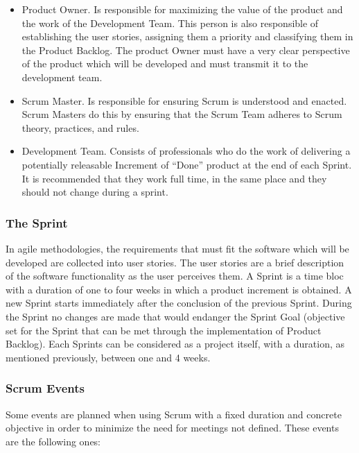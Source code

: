 \begin{itemize}
	\item Product Owner. Is responsible for maximizing the value of the product and the work of the	Development Team. This person is also responsible of establishing the user stories, assigning them a priority and classifying them in the Product Backlog. The product Owner must have a very clear perspective of the product which will be developed and must transmit it to the development team.
	
	\item Scrum Master. Is responsible for ensuring Scrum is understood and enacted. Scrum Masters do this by ensuring that the Scrum Team adheres to Scrum theory, practices, and rules. 
	
	\item Development Team. Consists of professionals who do the work of delivering a potentially releasable Increment of “Done” product at the end of each Sprint. It is recommended that they work full time, in the same place and they should not change during a sprint.
\end{itemize}


\subsubsection{The Sprint}

In agile methodologies, the requirements that must fit the software which will be developed are collected into user stories. The user stories are a brief description of the software functionality as the user perceives them. \cite{Coh04} A Sprint is a time bloc with a duration of one to four weeks in which a product increment is obtained. A new Sprint starts immediately after the conclusion of the previous Sprint. During the Sprint no changes are made that would endanger the Sprint Goal (objective set for the Sprint that can be met through the implementation of Product Backlog). Each Sprints can be considered as a project itself, with a duration, as mentioned previously, between one and 4 weeks.


\subsubsection{Scrum Events}
Some events are planned when using Scrum with a fixed duration and concrete objective in order to minimize the need for meetings not defined. These events are the following ones:

